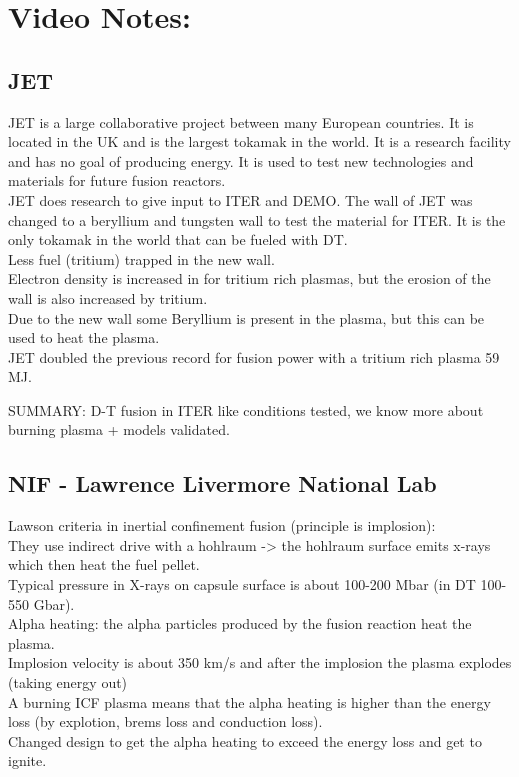 \section{Video Notes: }
\subsection{JET}
JET is a large collaborative project between many European countries. It is located in the UK and is the largest tokamak in the world. It is a research facility and has no goal of producing energy. It is used to test new technologies and materials for future fusion reactors.\\

JET does research to give input to ITER and DEMO. 
The wall of JET was changed to a beryllium and tungsten wall to test the material for ITER. It is the only tokamak in the world that can be fueled with DT.\\
Less fuel (tritium) trapped in the new wall. \\
Electron density is increased in for tritium rich plasmas, but the erosion of the wall is also increased by tritium.\\
Due to the new wall some Beryllium is present in the plasma, but this can be used to heat the plasma.\\

JET doubled the previous record for fusion power with a tritium rich plasma 59 MJ. 

SUMMARY: D-T fusion in ITER like conditions tested, we know more about burning plasma + models validated. 
\subsection{NIF - Lawrence Livermore National Lab}
Lawson criteria in inertial confinement fusion (principle is implosion):\\
They use indirect drive with a hohlraum -> the hohlraum surface emits x-rays which then heat the fuel pellet.\\
Typical pressure in X-rays on capsule surface is about 100-200 Mbar (in DT 100-550 Gbar).\\
Alpha heating: the alpha particles produced by the fusion reaction heat the plasma.\\
Implosion velocity is about 350 km/s and after the implosion the plasma explodes (taking energy out)\\
A burning ICF plasma means that the alpha heating is higher than the energy loss (by explotion, brems loss and conduction loss).\\
Changed design to get the alpha heating to exceed the energy loss and get to ignite. 

